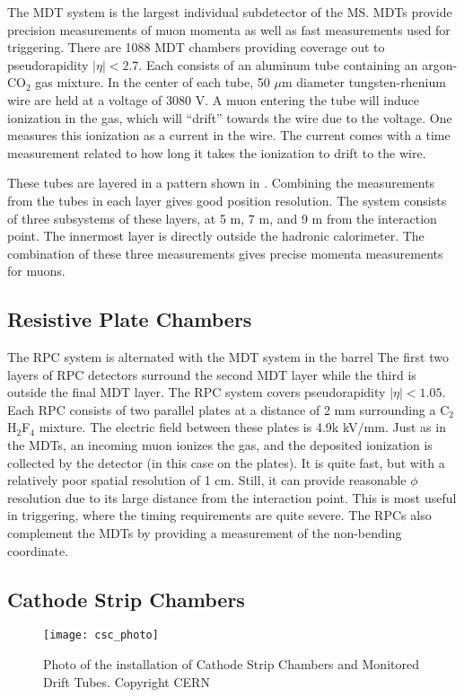 The MDT system is the largest individual subdetector of the MS.
MDTs provide precision measurements of muon momenta as well as fast measurements used for triggering.
There are 1088 MDT chambers providing coverage out to pseudorapidity $|\eta| < 2.7 $.
Each consists of an aluminum tube containing an argon-CO$_2$ gas mixture.
In the center of each tube, 50 $\mu$m diameter tungsten-rhenium wire are held at a voltage of 3080 V.
A muon entering the tube will induce ionization in the gas, which will ``drift'' towards the wire due to the voltage.
One measures this ionization as a current in the wire.
The current comes with a time measurement related to how long it takes the ionization to drift to the wire.

These tubes are layered in a pattern shown in .
Combining the measurements from the tubes in each layer gives good position resolution.
The system consists of three subsystems of these layers, at 5 m, 7 m, and 9 m from the interaction point.
The innermost layer is directly outside the hadronic calorimeter.
The combination of these three measurements gives precise momenta measurements for muons.

\subsection{Resistive Plate Chambers}

The RPC system is alternated with the MDT system in the barrel
The first two layers of RPC detectors surround the second MDT layer while the third is outside the final MDT layer.
The RPC system covers pseudorapidity $|\eta| < 1.05 $.
Each RPC consists of two parallel plates at a distance of 2 mm surrounding a C$_2$H$_2$F$_4$ mixture.
The electric field between these plates is 4.9k kV/mm.
Just as in the MDTs, an incoming muon ionizes the gas, and the deposited ionization is collected by the detector (in this case on the plates).
It is quite fast, but with a relatively poor spatial resolution of 1 cm.
Still, it can provide reasonable $\phi$ resolution due to its large distance from the interaction point.
This is most useful in triggering, where the timing requirements are quite severe.
The RPCs also complement the MDTs by providing a measurement of the non-bending coordinate.

\subsection{Cathode Strip Chambers}
\begin{figure}[tbp]
\caption{Photo of the installation of Cathode Strip Chambers and Monitored Drift Tubes. Copyright CERN} \label{fig:csc_photo}
\texttt{[image: csc\_photo]}
\end{figure}

